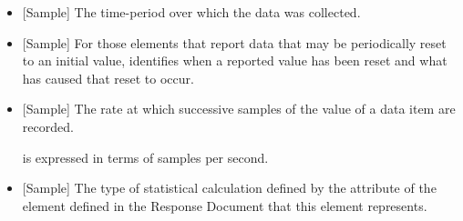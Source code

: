 \begin{itemize}

\item {}[Sample] \newline The time-period over which the data was collected.

\item {}[Sample] \newline For those  elements that report data that may be periodically reset to an initial value,  identifies when a reported value has been reset and what has caused that reset to occur.

\item {}[Sample] \newline The rate at which successive samples of the value of a data item are recorded.

 is expressed in terms of samples per second.

\item {}[Sample] \newline The type of statistical calculation defined by the  attribute of the  element defined in the  \gls{Response Document} that this element represents.
\end{itemize}


